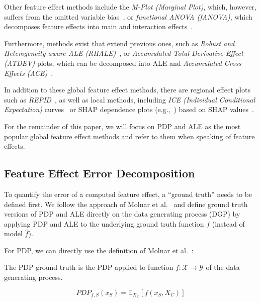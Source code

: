 \documentclass[runningheads]{llncs}
\begin{document}
\noindent Other feature effect methods include the \textit{M-Plot (Marginal Plot)},
which, however, suffers from the omitted variable
bias~\cite{apley_visualizing_2020,friedman_greedy_2001},
or \textit{functional ANOVA (fANOVA)}, which decomposes feature effects
into main and interaction effects~\cite{hooker_discovering_2004}.

Furthermore, methods exist that extend previous ones, such as \textit{Robust
    and Heterogeneity-aware ALE (RHALE)}~\cite{gkolemis_rhale_2023}, or
\textit{Accumulated Total Derivative Effect (ATDEV)} plots, which can be
decomposed into ALE and \textit{Accumulated Cross Effects
    (ACE)}~\cite{liu_model_2018}.

In addition to these global feature effect methods, there are regional effect
plots such as \textit{REPID}~\cite{herbinger_repid_2022}, as well as local
methods, including \textit{ICE (Individual Conditional Expectation)}
curves~\cite{goldstein_peeking_2015} or SHAP dependence plots
(e.g.,~\cite{molnar_interpretable_2022}) based on SHAP
values~\cite{lundberg_unified_2017}.

For the remainder of this paper, we will focus on PDP and ALE as the most
popular global feature effect methods and refer to them when speaking of
feature effects.

\subsection{Feature Effect Error Decomposition}

To quantify the error of a computed feature effect, a ``ground truth'' needs to
be defined first. We follow the approach of Molnar et
al.~\cite{molnar_relating_2023} and define ground truth versions of PDP and ALE
directly on the data generating process (DGP) by applying PDP and ALE to the
underlying ground truth function $f$ (instead of model $\hat f$).

For PDP, we can directly use the definition of Molnar et
al.~\cite{molnar_relating_2023}:

\begin{definition}
    The PDP ground truth is the PDP applied to function
    $f : \mathcal{X} \xrightarrow{} \mathcal{Y}$
    of the data generating process.

    \begin{equation}
        PDP_{f,S}(x_S) = \mathbb{E}_{X_C}[f(x_S,X_C)]
    \end{equation}
\end{definition}
\end{document}
